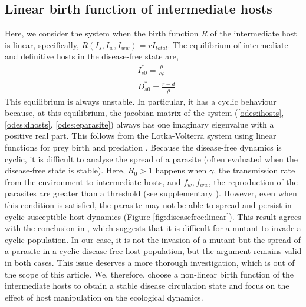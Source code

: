 \documentclass[11pt]{article}
\begin{document}
\subsection*{Linear birth function of intermediate hosts}
Here, we consider the system when the birth function $R$ of the intermediate host is linear, specifically, $R(I_s, I_w, I_{ww}) = r I_{total}$. 
The equilibrium of intermediate and definitive hosts in the disease-free state are,
%
\begin{align*}
& I_{s0}^* = \frac{\mu}{c \rho} \\
& D_{s0}^* = \frac{r - d}{\rho}
\end{align*}
%
This equilibrium is always unstable. 
In particular, it has a cyclic behaviour because, at this equilibrium, the jacobian matrix of the system (\ref{odes:ihosts}, \ref{odes:dhosts}, \ref{odes:eparasite}) always has one imaginary eigenvalue with a positive real part. 
This follows from the Lotka-Volterra system using linear functions for prey birth and predation \citep{Lotka1920}.
Because the disease-free dynamics is cyclic, it is difficult to analyse the spread of a parasite (often evaluated when the disease-free state is stable). 
Here,  $R_0 > 1$  happens when $\gamma$, the transmission rate from the environment to intermediate hosts, and $f_w, f_{ww}$, the reproduction of the parasites are greater than a threshold (see supplementary ). 
However, even when this condition is satisfied, the parasite may not be able to spread and persist in cyclic susceptible host dynamics (Figure \ref{fig:diseasefree:linear}). 
This result agrees with the conclusion in \citep{Ripa:Evol:2013}, which suggests that it is difficult for a mutant to invade a cyclic population. 
In our case, it is not the invasion of a mutant but the spread of a parasite in a cyclic disease-free host population, but the argument remains valid in both cases. 
This issue deserves a more thorough investigation, which is out of the scope of this article. 
We, therefore, choose a non-linear birth function of the intermediate hosts to obtain a stable disease circulation state and focus on the effect of host manipulation on the ecological dynamics. 
\end{document}

